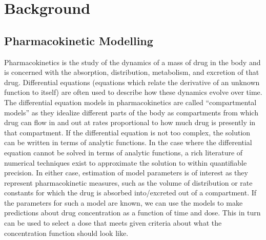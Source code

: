 \section{Background}
\subsection*{Pharmacokinetic Modelling}

Pharmacokinetics is the study of the dynamics of a mass of drug in the body and is concerned with the absorption, distribution, metabolism, and excretion of that drug.  Differential equations (equations which relate the derivative of an unknown function to itself) are often used to describe how these dynamics evolve over time. The differential equation models in pharmacokinetics are called “compartmental models” as they idealize different parts of the body as compartments from which drug can flow in and out at rates proportional to how much drug is presently in that compartment. If the differential equation is not too complex, the solution can be written in terms of analytic functions.  In the case where the differential equation cannot be solved in terms of analytic functions, a rich literature of numerical techniques exist to approximate the solution to within quantifiable precision. In either case, estimation of model parameters is of  interest as they represent pharmacokinetic measures, such as the volume of distribution or rate constants for which the drug is absorbed into/excreted out of a compartment. If the parameters for such a model are known, we can use the models to make predictions about drug concentration as a function of time and dose. This in turn can be used to select a dose that meets given criteria about what the concentration function should look like.

